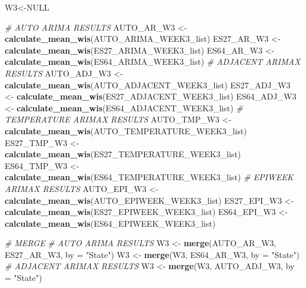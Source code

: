 \documentclass[
]{article}
\newenvironment{Shaded}{\begin{snugshade}}{\end{snugshade}}
\newcommand{\AttributeTok}[1]{\textcolor[rgb]{0.13,0.29,0.53}{#1}}
\newcommand{\CommentTok}[1]{\textcolor[rgb]{0.56,0.35,0.01}{\textit{#1}}}
\newcommand{\ConstantTok}[1]{\textcolor[rgb]{0.56,0.35,0.01}{#1}}
\newcommand{\FunctionTok}[1]{\textcolor[rgb]{0.13,0.29,0.53}{\textbf{#1}}}
\newcommand{\NormalTok}[1]{#1}
\newcommand{\OtherTok}[1]{\textcolor[rgb]{0.56,0.35,0.01}{#1}}
\newcommand{\StringTok}[1]{\textcolor[rgb]{0.31,0.60,0.02}{#1}}
\begin{document}
\begin{Shaded}
\begin{Highlighting}[]
\NormalTok{W3}\OtherTok{\textless{}{-}}\ConstantTok{NULL}

\CommentTok{\# AUTO ARIMA RESULTS}
\NormalTok{AUTO\_AR\_W3 }\OtherTok{\textless{}{-}} \FunctionTok{calculate\_mean\_wis}\NormalTok{(AUTO\_ARIMA\_WEEK3\_list)}
\NormalTok{ES27\_AR\_W3 }\OtherTok{\textless{}{-}} \FunctionTok{calculate\_mean\_wis}\NormalTok{(ES27\_ARIMA\_WEEK3\_list)}
\NormalTok{ES64\_AR\_W3 }\OtherTok{\textless{}{-}} \FunctionTok{calculate\_mean\_wis}\NormalTok{(ES64\_ARIMA\_WEEK3\_list)}
\CommentTok{\# ADJACENT ARIMAX RESULTS}
\NormalTok{AUTO\_ADJ\_W3 }\OtherTok{\textless{}{-}} \FunctionTok{calculate\_mean\_wis}\NormalTok{(AUTO\_ADJACENT\_WEEK3\_list)}
\NormalTok{ES27\_ADJ\_W3 }\OtherTok{\textless{}{-}} \FunctionTok{calculate\_mean\_wis}\NormalTok{(ES27\_ADJACENT\_WEEK3\_list)}
\NormalTok{ES64\_ADJ\_W3 }\OtherTok{\textless{}{-}} \FunctionTok{calculate\_mean\_wis}\NormalTok{(ES64\_ADJACENT\_WEEK3\_list)}
\CommentTok{\# TEMPERATURE ARIMAX RESULTS}
\NormalTok{AUTO\_TMP\_W3 }\OtherTok{\textless{}{-}} \FunctionTok{calculate\_mean\_wis}\NormalTok{(AUTO\_TEMPERATURE\_WEEK3\_list)}
\NormalTok{ES27\_TMP\_W3 }\OtherTok{\textless{}{-}} \FunctionTok{calculate\_mean\_wis}\NormalTok{(ES27\_TEMPERATURE\_WEEK3\_list)}
\NormalTok{ES64\_TMP\_W3 }\OtherTok{\textless{}{-}} \FunctionTok{calculate\_mean\_wis}\NormalTok{(ES64\_TEMPERATURE\_WEEK3\_list)}
\CommentTok{\# EPIWEEK ARIMAX RESULTS}
\NormalTok{AUTO\_EPI\_W3 }\OtherTok{\textless{}{-}} \FunctionTok{calculate\_mean\_wis}\NormalTok{(AUTO\_EPIWEEK\_WEEK3\_list)}
\NormalTok{ES27\_EPI\_W3 }\OtherTok{\textless{}{-}} \FunctionTok{calculate\_mean\_wis}\NormalTok{(ES27\_EPIWEEK\_WEEK3\_list)}
\NormalTok{ES64\_EPI\_W3 }\OtherTok{\textless{}{-}} \FunctionTok{calculate\_mean\_wis}\NormalTok{(ES64\_EPIWEEK\_WEEK3\_list)}

\CommentTok{\# MERGE}
\CommentTok{\# AUTO ARIMA RESULTS}
\NormalTok{W3 }\OtherTok{\textless{}{-}} \FunctionTok{merge}\NormalTok{(AUTO\_AR\_W3, ES27\_AR\_W3, }\AttributeTok{by =} \StringTok{"State"}\NormalTok{)}
\NormalTok{W3 }\OtherTok{\textless{}{-}} \FunctionTok{merge}\NormalTok{(W3, ES64\_AR\_W3, }\AttributeTok{by =} \StringTok{"State"}\NormalTok{)}
\CommentTok{\# ADJACENT ARIMAX RESULTS}
\NormalTok{W3 }\OtherTok{\textless{}{-}} \FunctionTok{merge}\NormalTok{(W3, AUTO\_ADJ\_W3, }\AttributeTok{by =} \StringTok{"State"}\NormalTok{)}
\end{Highlighting}
\end{Shaded}
\end{document}
